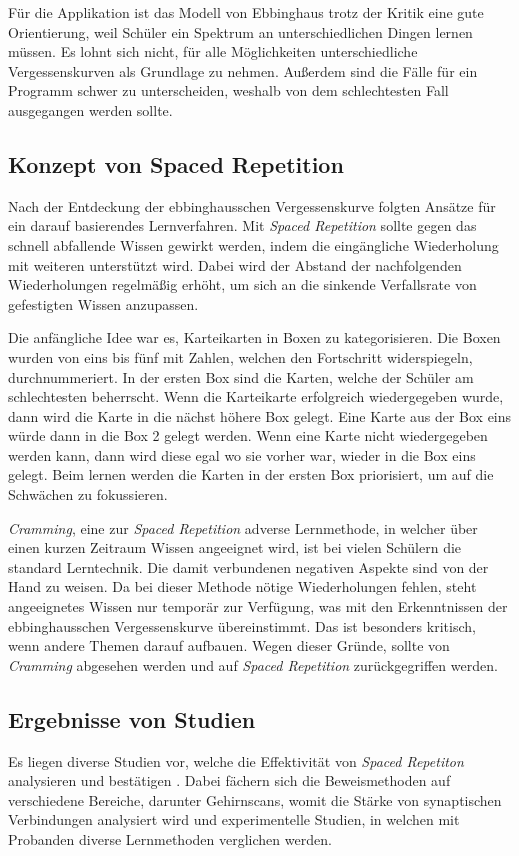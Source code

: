 Für die Applikation ist das Modell von Ebbinghaus trotz der Kritik eine gute Orientierung, weil Schüler ein Spektrum an unterschiedlichen Dingen lernen müssen. Es lohnt sich nicht, für alle Möglichkeiten unterschiedliche Vergessenskurven als Grundlage zu nehmen. Außerdem sind die Fälle für ein Programm schwer zu unterscheiden, weshalb von dem schlechtesten Fall ausgegangen werden sollte.

\subsection{Konzept von Spaced Repetition}
Nach der Entdeckung der ebbinghausschen Vergessenskurve folgten Ansätze für ein darauf basierendes Lernverfahren. Mit \textit{Spaced Repetition} sollte gegen das schnell abfallende Wissen gewirkt werden, indem die eingängliche Wiederholung mit weiteren unterstützt wird. Dabei wird der Abstand der nachfolgenden Wiederholungen regelmäßig erhöht, um sich an die sinkende Verfallsrate von gefestigten Wissen anzupassen. 

Die anfängliche Idee war es, Karteikarten in Boxen zu kategorisieren. Die Boxen wurden von eins bis fünf mit Zahlen, welchen den Fortschritt widerspiegeln, durchnummeriert. In der ersten Box sind die Karten, welche der Schüler am schlechtesten beherrscht. Wenn die Karteikarte erfolgreich wiedergegeben wurde, dann wird die Karte in die nächst höhere Box gelegt. Eine Karte aus der Box eins würde dann in die Box 2 gelegt werden. Wenn eine Karte nicht wiedergegeben werden kann, dann wird diese egal wo sie vorher war, wieder in die Box eins gelegt. Beim lernen werden die Karten in der ersten Box priorisiert, um auf die Schwächen zu fokussieren.

\textit{Cramming}, eine zur \textit{Spaced Repetition} adverse Lernmethode, in welcher über einen kurzen Zeitraum Wissen angeeignet wird, ist bei vielen Schülern die standard Lerntechnik. Die damit verbundenen negativen Aspekte sind von der Hand zu weisen. Da bei dieser Methode nötige Wiederholungen fehlen, steht angeeignetes Wissen nur temporär zur Verfügung, was mit den Erkenntnissen der ebbinghausschen Vergessenskurve übereinstimmt. Das ist besonders kritisch, wenn andere Themen darauf aufbauen. Wegen dieser Gründe, sollte von \textit{Cramming} abgesehen werden und auf \textit{Spaced Repetition} zurückgegriffen werden.

\subsection{Ergebnisse von Studien}
Es liegen diverse Studien vor, welche die Effektivität von \textit{Spaced Repetiton} analysieren und bestätigen \cite{PNAS:Synaptic}\cite{RD:SpacedRepetition}. Dabei fächern sich die Beweismethoden auf verschiedene Bereiche, darunter Gehirnscans, womit die Stärke von synaptischen Verbindungen analysiert wird und experimentelle Studien, in welchen mit Probanden diverse Lernmethoden verglichen werden.

